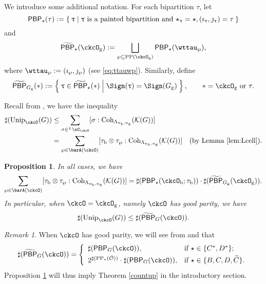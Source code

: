 \documentclass[12pt,a4paper]{amsart}
\newcommand{\CK}{{\mathcal {K}}}
\newcommand{\CO}{{\mathcal {O}}}
\numberwithin{equation}{section}
\newtheorem{prop}[thm]{Proposition}
\theoremstyle{remark}
\newtheorem{remark}[thm]{Remark}
\def\Unip{\mathrm{Unip}}
\def\LC{{}^{\scriptscriptstyle L}\sC}
\def\Coh{\mathrm{Coh}}
\def\CPP{\mathrm{PP}}
\def\CPPs{\mathrm{PP}_{\star}}
\def\tPBP{\widetilde{\mathsf{PBP}}}
\def\PBP{\mathsf{PBP}}
\def\ckcOg{\ckcO_{\mathrm g}}
\def\tPBP{\widetilde{\mathsf{PBP}}}
\begin{document}
We introduce some additional notation. For each bipartition $\tau$, let
\[
  \PBP_{\star}(\tau) := \Set{ \uptau|\uptau \text{ is a painted bipartition and
    } \star_{\uptau}=\star, (\imath_{\uptau},\jmath_{\uptau}) = \tau}
\]
and
\[
  \tPBP_{\star}(\ckcO_{\mathrm g}) := %
  \bigsqcup_{\wp \subseteq \CPP(\ckcO_{\mathrm g})}\PBP_{\star}(\wttau_{\wp}),
\]
where $\wttau_{\wp} := (\imath_{\wp},\jmath_{\wp})$ (see \eqref{eq:ttauwp}). Similarly, define
\[
  \tPBP_{G_{\mathrm g}}(\ast):= \Set{\uptau\in \tPBP_{\star}(\ast )|\Sign(\uptau)= \Sign(G_{\mathrm g})}, \quad  \quad
  \ast  = \ckcO_{\mathrm g} \text{ or } \tau.
\]

Recall from , we have the inequality
\[
\begin{split}
\sharp (\Unip_{\ckcO}(G))&\leq \sum_{\sigma\in \LC_{\ckcO}} [\sigma: \Coh_{\Lambda_{n_{\mathrm b},n_{\mathrm g}}}(\CK(G))]\\
  & =\sum_{\wp\in \barA(\ckcO)} [\tau_{\mathrm b}\otimes \tau_{\wp}: \Coh_{\Lambda_{n_{\mathrm b},n_{\mathrm g}}}(\CK(G))] \quad (\textrm{by Lemma \ref{lem:Lcell}}).
\end{split}
\]


\begin{prop}\label{prop:countBCD}
  In all cases, we have
  \[
  \sum_{\wp\in \barA(\ckcO)} [\tau_{\mathrm b}\otimes \tau_{\wp}: \Coh_{\Lambda_{n_{\mathrm b},n_{\mathrm g}}}(\CK(G))]
      = \sharp (\PBP_{\star}(\ckcO_{\mathrm b};\tau _{\mathrm b}))\cdot \sharp(\tPBP_{G_{\mathrm g}}(\ckcO_{\mathrm g})).
  \]
 In particular, when $\ckcO = \ckcO_{\mathrm g}$, namely $\ckcO $ has good parity, we have
  \[
  \sharp (\Unip_{\ckcO}(G))\leq
     \sharp ({\tPBP_{G}(\ckcO)}).
  \]
 \end{prop}

 \begin{remark} When $\ckcO $ has good parity, we will see from  and  that
  \[
    \sharp(\tPBP_{G}(\ckcO)) =
    \left\{
    \begin{array}{ll}
       \sharp (\PBP_{G}(\ckcO)),  & \hbox{if $\star\in \{C^*,D^*\}$}; \smallskip\\
       2^{\sharp(\CPPs(\check \CO))} \cdot \sharp (\PBP_{G}(\ckcO)),  &\hbox{if $\star\in \{B, C,D,\widetilde {C}\}$}.
    \end{array}
  \right.
  \]
 Proposition \ref{prop:countBCD} will thus imply Theorem \ref{countup} in the introductory section.
 \end{remark}
\end{document}
